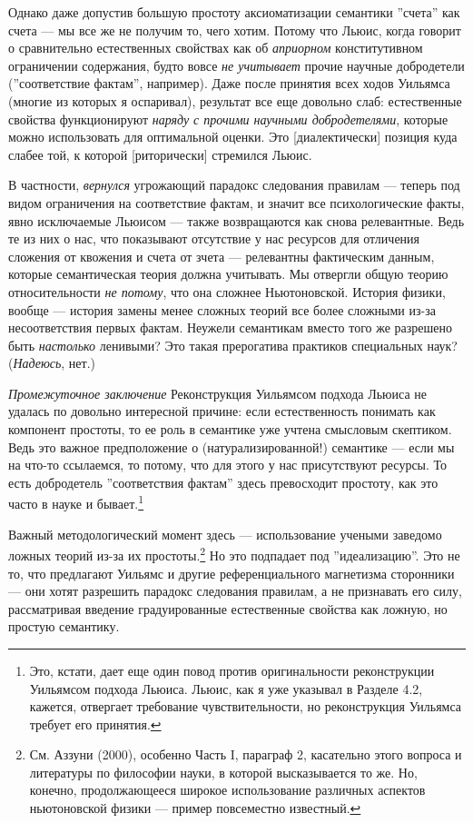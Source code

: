 \documentclass[11pt]{book}
\begin{document}
Однако даже допустив большую простоту аксиоматизации семантики ''счета'' как счета --- мы все же не получим то, чего хотим. Потому что Льюис, когда говорит о сравнительно естественных свойствах как об \textit{априорном} конститутивном ограничении содержания, будто вовсе \textit{не учитывает} прочие научные добродетели (''соответствие фактам'', например). Даже после принятия всех ходов Уильямса (многие из которых я оспаривал), результат все еще довольно слаб: естественные свойства функционируют \textit{наряду с прочими научными добродетелями}, которые можно использовать для оптимальной оценки. Это [диалектически] позиция куда слабее той, к которой [риторически] стремился Льюис.

В частности, \textit{вернулся} угрожающий парадокс следования правилам --- теперь под видом ограничения на соответствие фактам, и значит все психологические факты, явно исключаемые Льюисом --- также возвращаются как снова релевантные. Ведь те из них о нас, что показывают отсутствие у нас ресурсов для отличения сложения от квожения и счета от зчета --- релевантны фактическим данным, которые семантическая теория должна учитывать. Мы отвергли общую теорию относительности \textit{не потому}, что она сложнее Ньютоновской. История физики, вообще --- история замены менее сложных теорий все более сложными из-за несоответствия первых фактам. Неужели семантикам вместо того же разрешено быть \textit{настолько} ленивыми? Это такая прерогатива практиков специальных наук? (\textit{Надеюсь}, нет.)

\textit{Промежуточное заключение} \quad Реконструкция Уильямсом подхода Льюиса не удалась по довольно интересной причине: если естественность понимать как компонент простоты, то ее роль в семантике уже учтена смысловым скептиком. Ведь это важное предположение о (натурализированной!) семантике --- если мы на что-то ссылаемся, то потому, что для этого у нас присутствуют ресурсы. То есть добродетель ''соответствия фактам'' здесь превосходит простоту, как это часто в науке и бывает.\footnote{Это, кстати, дает еще один повод против оригинальности реконструкции Уильямсом подхода Льюиса. Льюис, как я уже указывал в Разделе 4.2, кажется, отвергает требование чувствительности, но реконструкция Уильямса требует его принятия.}

Важный методологический момент здесь --- использование учеными заведомо ложных теорий из-за их простоты.\footnote{См. Аззуни (2000), особенно Часть I, параграф 2, касательно этого вопроса и литературы по философии науки, в которой высказывается то же. Но, конечно, продолжающееся широкое использование различных аспектов ньютоновской физики --- пример повсеместно известный.} Но это подпадает под ''идеализацию''. Это не то, что предлагают Уильямс и другие референциального магнетизма сторонники --- они хотят разрешить парадокс следования правилам, а не признавать его силу, рассматривая введение градуированные естественные свойства как ложную, но простую семантику.
\end{document}
